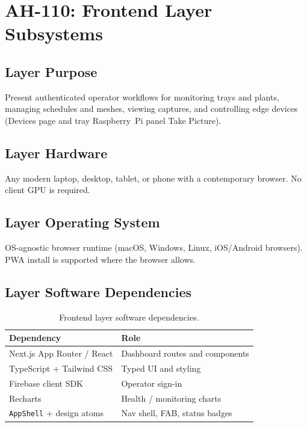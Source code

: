 \documentclass[11pt,letterpaper]{article}
\begin{document}
\section{AH-110: Frontend Layer Subsystems}

\subsection{Layer Purpose}
Present authenticated operator workflows for monitoring trays and plants, managing schedules
and meshes, viewing captures, and controlling edge devices (Devices page and tray Raspberry~Pi
panel Take Picture).

\subsection{Layer Hardware}
Any modern laptop, desktop, tablet, or phone with a contemporary browser. No client GPU is
required.

\subsection{Layer Operating System}
OS-agnostic browser runtime (macOS, Windows, Linux, iOS/Android browsers). PWA install is
supported where the browser allows.

\subsection{Layer Software Dependencies}
\begin{table}[H]
\centering
\begin{tabular}{@{}p{4.2cm}p{9.5cm}@{}}
\toprule
\textbf{Dependency} & \textbf{Role} \\
\midrule
Next.js App Router / React & Dashboard routes and components \\
TypeScript + Tailwind CSS & Typed UI and styling \\
Firebase client SDK & Operator sign-in \\
Recharts & Health / monitoring charts \\
\texttt{AppShell} + design atoms & Nav shell, FAB, status badges \\
\bottomrule
\end{tabular}
\caption{Frontend layer software dependencies.}
\label{tab:fe-deps}
\end{table}
\end{document}
